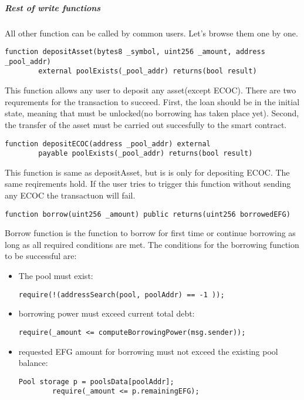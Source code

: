 \documentclass{article}
\begin{document}
\subparagraph{Rest of write functions}
All other function can be called by common users. Let's browse them one by one.
\\
\begin{lstlisting}[language=Solidity,numbers=none,escapechar=@]
function depositAsset(bytes8 _symbol, uint256 _amount, address _pool_addr)
        external poolExists(_pool_addr) returns(bool result)
\end{lstlisting}
This function allows any user to deposit any asset(except ECOC). There are two requrements for the transaction to succeed. First, the loan should be in the initial state, meaning that must be unlocked(no borrowing has taken place yet). Second, the transfer of the asset must be carried out succesfully to the smart contract.
\\
\begin{lstlisting}[language=Solidity,numbers=none,escapechar=@]
 function depositECOC(address _pool_addr) external
        payable poolExists(_pool_addr) returns(bool result)
\end{lstlisting}
This function is same as depositAsset, but is is only for depositing ECOC. The same reqirements hold. If the user tries to trigger this function without sending any ECOC the transactuon will fail.
\\
\begin{lstlisting}[language=Solidity,numbers=none,escapechar=@]
function borrow(uint256 _amount) public returns(uint256 borrowedEFG)
\end{lstlisting}
Borrow function is the function to borrow for first time or continue borrowing as long as all required conditions are met. The conditions for the borrowing function to be successful are:
\begin{itemize}
\item The pool must exist:
\begin{lstlisting}[language=Solidity,numbers=none,escapechar=@]
  	 require(!(addressSearch(pool, poolAddr) == -1 ));
\end{lstlisting}
\item borrowing power must exceed current total debt:
\begin{lstlisting}[language=Solidity,numbers=none,escapechar=@]
	require(_amount <= computeBorrowingPower(msg.sender));
\end{lstlisting}
\item  requested EFG amount for borrowing must not exceed the existing pool balance:
\begin{lstlisting}[language=Solidity,numbers=none,escapechar=@]
 Pool storage p = poolsData[poolAddr];
	    require(_amount <= p.remainingEFG);
\end{lstlisting}
\end{itemize}
\end{document}
